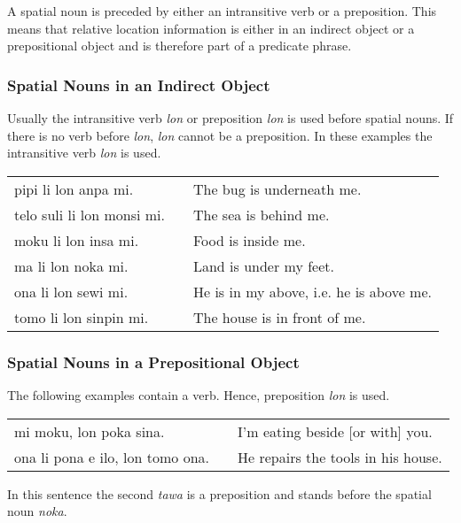 A spatial noun is preceded by either an intransitive verb or a preposition.
This means that relative location information is either in an indirect object or a prepositional object and is therefore part of a predicate phrase.

\subsubsection*{Spatial Nouns in an Indirect Object}

Usually the intransitive verb \textit{lon} or preposition \textit{lon} is used before spatial nouns.
If there is no verb before \textit{lon}, \textit{lon} cannot be a preposition.
In these examples the intransitive verb \textit{lon} is used.

\begin{supertabular}{p{5,5cm}|ll}
    pipi li lon anpa mi.       &  & The bug is underneath me.               \\
    telo suli li lon monsi mi. &  & The sea is behind me.                   \\
    moku li lon insa mi.       &  & Food is inside me.                      \\
    ma li lon noka mi.         &  & Land is under my feet.                  \\
    ona li lon sewi mi.        &  & He is in my above, i.e. he is above me. \\
    tomo li lon sinpin mi.     &  & The house is in front of me.            \\
\end{supertabular}

\subsubsection*{Spatial Nouns in a Prepositional Object}
The following examples contain a verb.
Hence, preposition \textit{lon} is used.

\begin{supertabular}{p{5,5cm}|ll}
    mi moku, lon poka sina.          &  & I'm eating beside [or with] you.   \\
    ona li pona e ilo, lon tomo ona. &  & He repairs the tools in his house. \\
\end{supertabular}

In this sentence the second \textit{tawa} is a preposition and stands before the spatial noun \textit{noka}.

